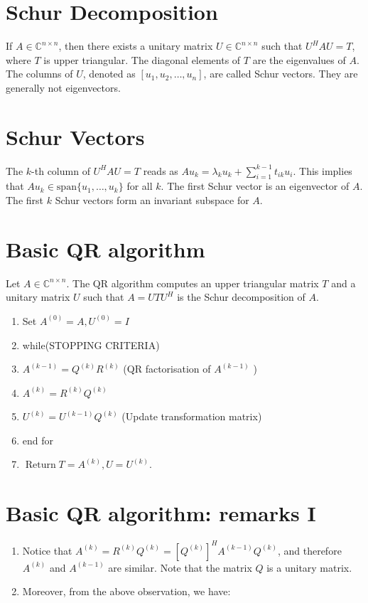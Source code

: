 \documentclass[11pt]{book}
\begin{document}
\section*{Schur Decomposition}
If $A \in \mathbb{C}^{n \times n}$, then there exists a unitary matrix $U \in \mathbb{C}^{n \times n}$ such that $U^H AU = T$, where $T$ is upper triangular. The diagonal elements of $T$ are the eigenvalues of $A$. The columns of $U$, denoted as $[u_1, u_2, \ldots, u_n]$, are called Schur vectors. They are generally not eigenvectors.
\section*{Schur Vectors}
The $k$-th column of $U^H AU = T$ reads as $A u_k = \lambda_k u_k + \sum_{i=1}^{k-1} t_{ik} u_i$. This implies that $A u_k \in \text{span} \{u_1, \ldots, u_k\}$ for all $k$. The first Schur vector is an eigenvector of $A$. The first $k$ Schur vectors form an invariant subspace for $A$.

\section*{Basic QR algorithm}
Let $A \in \mathbb{C}^{n \times n}$. The QR algorithm computes an upper triangular matrix $T$ and a unitary matrix $U$ such that $A=U T U^{H}$ is the Schur decomposition of $A$.
\begin{enumerate}
  \item Set $A^{(0)}=A, U^{(0)}=I$

  \item while(STOPPING CRITERIA)

  \item $A^{(k-1)}=Q^{(k)} R^{(k)}$ (QR factorisation of $A^{(k-1)}$ )

  \item $A^{(k)}=R^{(k)} Q^{(k)}$

  \item $U^{(k)}=U^{(k-1)} Q^{(k)}$ (Update transformation matrix)

  \item end for

  \item $\operatorname{Return} T=A^{(k)}, U=U^{(k)}$.

\end{enumerate}

\section*{Basic QR algorithm: remarks I}
\begin{enumerate}
  \item Notice that $A^{(k)}=R^{(k)} Q^{(k)}=\left[Q^{(k)}\right]^{H} A^{(k-1)} Q^{(k)}$, and therefore $A^{(k)}$ and $A^{(k-1)}$ are similar. Note that the matrix $Q$ is a unitary matrix.

  \item Moreover, from the above observation, we have:

\end{enumerate}
\end{document}
